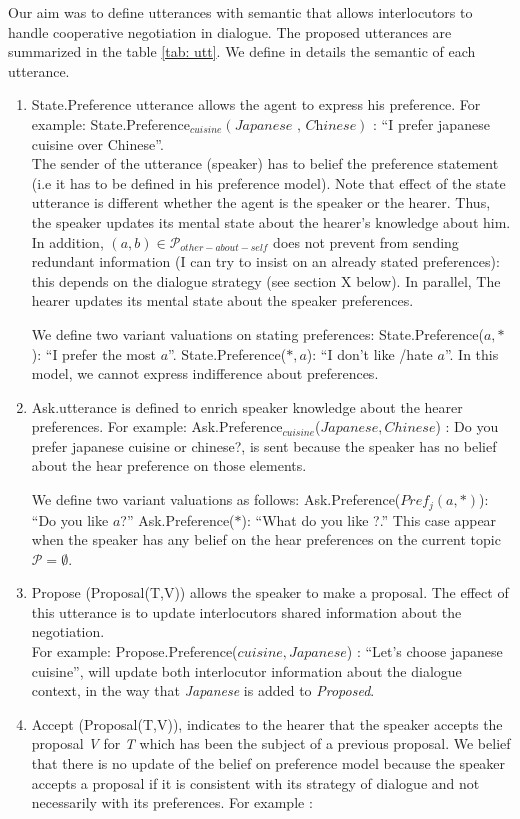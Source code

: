 \documentclass{llncs}
\begin{document}
\par  Our aim was to define utterances with semantic that allows interlocutors to handle cooperative negotiation in dialogue. The proposed utterances are summarized in the table \ref{tab: utt}. We define in details the semantic of each utterance.
\begin{enumerate}
	\item  State.Preference utterance allows the agent to express his preference. For example: State.Preference$_{cuisine}(\textit{Japanese , Chinese})$ : ``I prefer japanese cuisine over Chinese''. 
	\\The  sender of the utterance (speaker) has to belief the preference statement (i.e it has to be defined in his preference model). Note that effect of the state utterance is different whether the agent is the speaker or the hearer. Thus,  the speaker updates its mental state about the hearer's knowledge about him. In addition, $(a,b) \in \mathcal{P}_{other-about-self}$ does not prevent from sending redundant information (I can try to insist on an already stated preferences): this depends on the dialogue strategy (see section X below). In parallel, The hearer updates its mental state about the speaker preferences.	
	\par We define two variant valuations on stating preferences: 
	 	\subitem State.Preference(\textit{$a, *$}): ``I prefer the most $a$''.
	 	\subitem State.Preference(\textit{$*, a$}): ``I don't like /hate $a$''.
	 	\subitem In this model, we cannot express indifference about preferences.%
	 	\\
	\item Ask.utterance is defined to enrich speaker knowledge about the hearer preferences. For  example: Ask.Preference$_{cuisine}$(\textit{$Japanese , Chinese$}) : Do you prefer japanese cuisine or chinese?, is sent because the speaker has no belief about the hear preference on those elements. 
	\par We define two variant valuations as follows: 
	 	\subitem Ask.Preference(\textit{$Pref_{j}(a, *)$}): ``Do you like $a$?''
	 	\subitem Ask.Preference(\textit{$*$}): ``What do you like ?.'' This case appear when the speaker has any belief on the hear preferences on the current topic$\mathcal{P}= \emptyset$. 
	\\
	\item Propose (Proposal(T,V)) allows the speaker to make a proposal. The effect of this utterance is to update interlocutors shared information about the negotiation.
	\\ For example: Propose.Preference(\textit{$cuisine,Japanese$}) : ``Let's choose japanese cuisine'', will update both interlocutor information about the dialogue context, in the way that \textit{Japanese} is added to \textit{Proposed}.
	\\
	\item Accept (Proposal(T,V)), indicates to the hearer that the speaker accepts the proposal \textit{V} for \textit{T} which has been the subject of a previous  proposal. We belief that there is no update of the belief on preference model because the speaker accepts a proposal if it is consistent with its strategy of dialogue and not necessarily with its preferences. For example : 
	

\end{enumerate}
\end{document}
